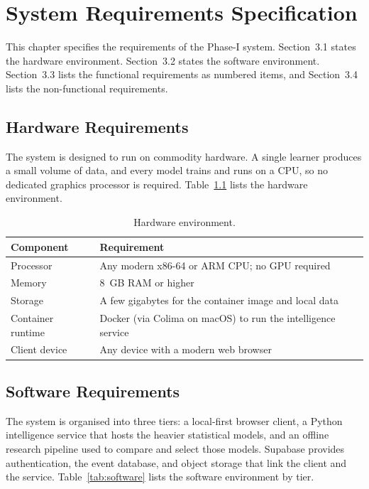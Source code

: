\chapter{System Requirements Specification}
This chapter specifies the requirements of the Phase-I system. Section~3.1 states the hardware environment. Section~3.2 states the software environment. Section~3.3 lists the functional requirements as numbered items, and Section~3.4 lists the non-functional requirements.

\section{Hardware Requirements}
The system is designed to run on commodity hardware. A single learner produces a small volume of data, and every model trains and runs on a CPU, so no dedicated graphics processor is required. Table~\ref{tab:hardware} lists the hardware environment.

\begin{table}[htbp]
\centering
\caption{Hardware environment.}
\label{tab:hardware}
\begin{tabular}{p{4.2cm} p{8.0cm}}
\toprule
\textbf{Component} & \textbf{Requirement} \\
\midrule
Processor & Any modern x86-64 or ARM CPU; no GPU required \\
Memory & 8~GB RAM or higher \\
Storage & A few gigabytes for the container image and local data \\
Container runtime & Docker (via Colima on macOS) to run the intelligence service \\
Client device & Any device with a modern web browser \\
\bottomrule
\end{tabular}
\end{table}

\section{Software Requirements}
The system is organised into three tiers: a local-first browser client, a Python intelligence service that hosts the heavier statistical models, and an offline research pipeline used to compare and select those models. Supabase provides authentication, the event database, and object storage that link the client and the service. Table~\ref{tab:software} lists the software environment by tier.

